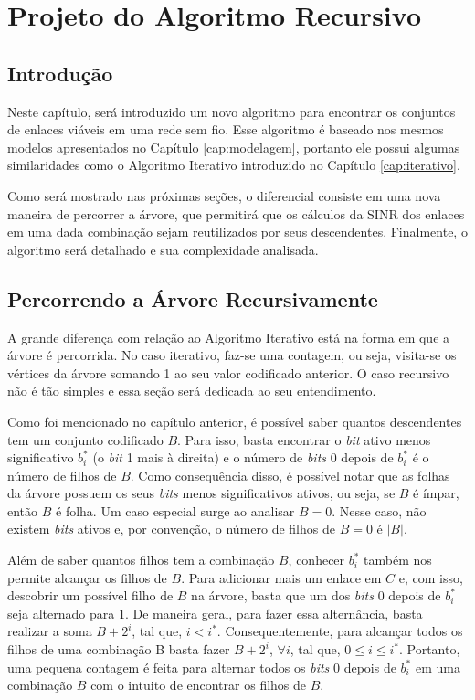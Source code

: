 \chapter{Projeto do Algoritmo Recursivo}
\label{cap:recursivo}

\section{Introdução}

Neste capítulo, será introduzido um novo algoritmo para encontrar os conjuntos de enlaces viáveis em uma rede sem fio. Esse algoritmo é baseado nos mesmos modelos apresentados no Capítulo \ref{cap:modelagem}, portanto ele possui algumas similaridades como o Algoritmo Iterativo introduzido no Capítulo \ref{cap:iterativo}. 

Como será mostrado nas próximas seções, o diferencial consiste em uma nova maneira de percorrer a árvore, que permitirá que os cálculos da SINR dos enlaces em uma dada combinação sejam reutilizados por seus descendentes. Finalmente, o algoritmo será detalhado e sua complexidade analisada.

\section{Percorrendo a Árvore Recursivamente}

A grande diferença com relação ao Algoritmo Iterativo está na forma em que a árvore é percorrida. No caso iterativo, faz-se uma contagem, ou seja, visita-se os vértices da árvore somando 1 ao seu valor codificado anterior. O caso recursivo não é tão simples e essa seção será dedicada ao seu entendimento.

Como foi mencionado no capítulo anterior, é possível saber quantos descendentes tem um conjunto codificado $B$. Para isso, basta encontrar o {\it bit} ativo menos significativo $b_i^*$ (o {\it bit} 1 mais à direita) e o número de {\it bits} 0 depois de $b_i^*$ é o número de filhos de $B$. Como consequência disso, é possível notar que as folhas da árvore possuem os seus {\it bits} menos significativos ativos, ou seja, se $B$ é ímpar, então $B$ é folha. Um caso especial surge ao analisar $B=0$. Nesse caso, não existem {\it bits} ativos e, por convenção, o número de filhos de $B=0$ é $|B|$.

Além de saber quantos filhos tem a combinação $B$, conhecer $b_i^*$ também nos permite alcançar os filhos de $B$. Para adicionar mais um enlace em $C$ e, com isso, descobrir um possível filho de $B$ na árvore, basta que um dos {\it bits} 0 depois de $b_i^*$ seja alternado para 1. De maneira geral, para fazer essa alternância, basta realizar a soma $B + 2^i$, tal que, $i < i^*$. Consequentemente, para alcançar todos os filhos de uma combinação B basta fazer $B + 2^i$, $\forall i$, tal que, $0\leq i\leq i^*$. Portanto, uma pequena contagem é feita para alternar todos os {\it bits} 0 depois de $b_i^*$ em uma combinação $B$ com o intuito de encontrar os filhos de $B$.

